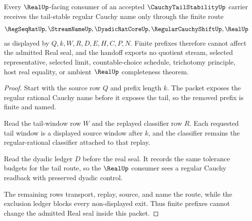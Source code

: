 \begin{theorem}
\label{thm:cauchy-tail-stability-real-seal-handoff}
Every $\RealUp$-facing consumer of an accepted $\CauchyTailStabilityUp$ carrier receives the tail-stable regular Cauchy name only through the finite route
$$
\RegSeqRatUp,\StreamNameUp,\DyadicRatCoreUp,\RegularCauchyShiftUp,\RealUp
$$
as displayed by $Q,k,W,R,D,E,H,C,P,N$. Finite prefixes therefore cannot affect the admitted Real seal, and the handoff exports no quotient stream, selected representative, selected limit, countable-choice schedule, trichotomy principle, host real equality, or ambient $\RealUp$ completeness theorem.
\end{theorem}
\begin{proof}
Start with the source row $Q$ and prefix length $k$. The packet exposes the regular rational Cauchy name before it exposes the tail, so the removed prefix is finite and named.

Read the tail-window row $W$ and the replayed classifier row $R$. Each requested tail window is a displayed source window after $k$, and the classifier remains the regular-rational classifier attached to that replay.

Read the dyadic ledger $D$ before the real seal. It records the same tolerance budgets for the tail route, so the $\RealUp$ consumer sees a regular Cauchy readback with preserved dyadic control.

The remaining rows transport, replay, source, and name the route, while the exclusion ledger blocks every non-displayed exit. Thus finite prefixes cannot change the admitted Real seal inside this packet.
\end{proof}




